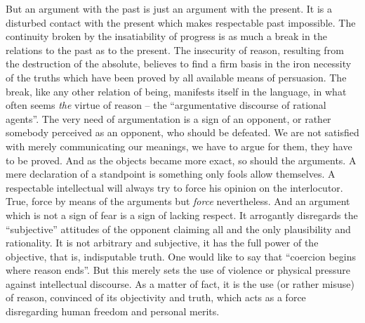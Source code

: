 But an argument with the past is just an argument with the present. It is a
disturbed contact with the present which makes respectable past impossible.
The continuity broken by the
insatiability of progress is as much a break in the relations to the past as
to the present. The insecurity of reason, resulting from the 
destruction of the absolute, believes to find a firm basis
 in the iron necessity of the truths which have been proved by all available 
means of persuasion.  The break, like any other relation of being, manifests 
itself in the language, in what often seems
{\em the} virtue of reason -- the ``argumentative discourse of rational 
agents''.
The very need of argumentation is a sign of an opponent, or rather somebody
perceived as an opponent, who should be defeated. We are not satisfied with
merely communicating our meanings, we have to argue for them, they have to be
proved. And as the objects became more exact, so should the arguments. 
A mere declaration of a standpoint is something only fools allow themselves. A
respectable intellectual will always try to force his opinion on the 
interlocutor. True, force by means of the arguments but {\em force} 
nevertheless. And an argument which is not a sign of fear is a sign of lacking 
respect. It arrogantly disregards the ``subjective'' attitudes of the opponent
claiming all and the only  plausibility and rationality. It is not arbitrary and 
subjective, it has
the full power of the objective, that is, indisputable truth. One would like
to say that ``coercion begins where reason ends''. But this merely sets the use
of violence or physical pressure against intellectual discourse. As a matter
of fact, it is the use (or rather misuse) of reason, convinced of its 
objectivity and truth, which acts as a force disregarding human freedom and 
personal merits.

